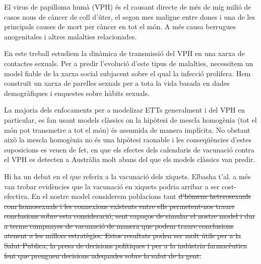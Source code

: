 El virus de papilloma hum\`a (VPH) és el causant directe de m\'es de mig mili\'o de casos nous de c\`ancer de coll d'\'uter, el segon mes maligne entre dones i una de les principals causes de mort per c\`ancer en tot el món. A m\'es causa berrugues anogenitales i altres malalties relacionades. 

En este treball estudiem la din\`amica de transmissi\'o del VPH en una xarxa de contactes sexuals. Per a predir l'evoluci\'o d'este tipus de malalties, necessitem un model fiable de la xarxa social subjacent sobre el qual la infecció prolifera. Hem construït un xarxa de parelles sexuals per a tota la vida basada en dades demogr\`afiques i enquestes sobre h\`abits sexuals.

La majoria dels enfocaments per a modelizar ETTs generalment i del VPH en particular, es fan usant models clàssics on la hip\`otesi de mescla homog\`enia (tot el m\'on pot transmetre a tot el m\'on) \'es assumida de manera impl\'icita. No obstant aix\`o la mescla homog\`enia no és una hip\`otesi raonable i les conseq\"u\`encies d'estes suposicions es veuen de fet, en que els efectes dels calendaris de vacunaci\'o contra el VPH es detecten a Austr\`alia molt abans del que els models cl\`assics van predir.

Hi ha un debat en el que referix a la vacunació dels xiquets. Elbasha t'al. a m\'es van trobar evid\`encies que la vacunaci\'o en xiquets podria arribar a ser cost-efectiva. En el nostre model considerem poblacions tant \st{d'h\`omens heterosexuals com homosexuals i les connexions existents entre ells permetent-nos traure conclusions sobre esta consideraci\'o, sent capaços de simular el nostre model i dur a terme campanyes de vacunaci\'o de manera que podem traure conclusions atenent a les millors estrat\`egies. Estos resultats poden ser molt \'utils per a la Salut Publica, la presa de decisions pol\'itiques i per a la ind\'ustria farmac\`eutica fent que prenguen decisions adequades sobre la salut de la gent.}
